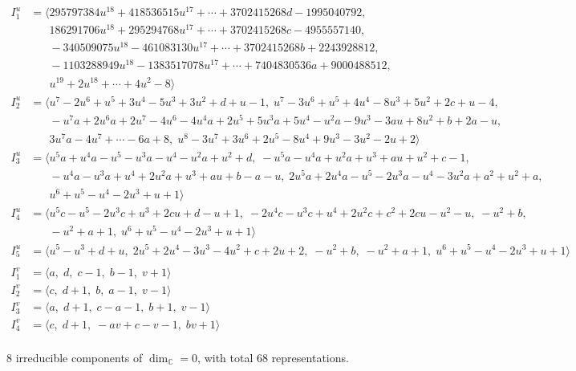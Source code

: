 \documentclass[1p]{elsarticle_modified}
\theoremstyle{definition}
\begin{document}
\begin{align*}
I^u_{1}&=\langle 
295797384 u^{18}+418536515 u^{17}+\cdots+3702415268 d-1995040792,\\
\phantom{I^u_{1}}&\phantom{= \langle  }186291706 u^{18}+295294768 u^{17}+\cdots+3702415268 c-4955557140,\\
\phantom{I^u_{1}}&\phantom{= \langle  }-340509075 u^{18}-461083130 u^{17}+\cdots+3702415268 b+2243928812,\\
\phantom{I^u_{1}}&\phantom{= \langle  }-1103288949 u^{18}-1383517078 u^{17}+\cdots+7404830536 a+9000488512,\\
\phantom{I^u_{1}}&\phantom{= \langle  }u^{19}+2 u^{18}+\cdots+4 u^2-8\rangle \\
I^u_{2}&=\langle 
u^7-2 u^6+u^5+3 u^4-5 u^3+3 u^2+d+u-1,\;u^7-3 u^6+u^5+4 u^4-8 u^3+5 u^2+2 c+u-4,\\
\phantom{I^u_{2}}&\phantom{= \langle  }- u^7 a+2 u^6 a+2 u^7-4 u^6-4 u^4 a+2 u^5+5 u^3 a+5 u^4- u^2 a-9 u^3-3 a u+8 u^2+b+2 a- u,\\
\phantom{I^u_{2}}&\phantom{= \langle  }3 u^7 a-4 u^7+\cdots-6 a+8,\;u^8-3 u^7+3 u^6+2 u^5-8 u^4+9 u^3-3 u^2-2 u+2\rangle \\
I^u_{3}&=\langle 
u^5 a+u^4 a- u^5- u^3 a- u^4- u^2 a+u^2+d,\;- u^5 a- u^4 a+u^2 a+u^3+a u+u^2+c-1,\\
\phantom{I^u_{3}}&\phantom{= \langle  }- u^4 a- u^3 a+u^4+2 u^2 a+u^3+a u+b- a- u,\;2 u^5 a+2 u^4 a- u^5-2 u^3 a- u^4-3 u^2 a+a^2+u^2+a,\\
\phantom{I^u_{3}}&\phantom{= \langle  }u^6+u^5- u^4-2 u^3+u+1\rangle \\
I^u_{4}&=\langle 
u^5 c- u^5-2 u^3 c+u^3+2 c u+d- u+1,\;-2 u^4 c- u^3 c+u^4+2 u^2 c+c^2+2 c u- u^2- u,\;- u^2+b,\\
\phantom{I^u_{4}}&\phantom{= \langle  }- u^2+a+1,\;u^6+u^5- u^4-2 u^3+u+1\rangle \\
I^u_{5}&=\langle 
u^5- u^3+d+u,\;2 u^5+2 u^4-3 u^3-4 u^2+c+2 u+2,\;- u^2+b,\;- u^2+a+1,\;u^6+u^5- u^4-2 u^3+u+1\rangle \\
\\
I^v_{1}&=\langle 
a,\;d,\;c-1,\;b-1,\;v+1\rangle \\
I^v_{2}&=\langle 
c,\;d+1,\;b,\;a-1,\;v-1\rangle \\
I^v_{3}&=\langle 
a,\;d+1,\;c- a-1,\;b+1,\;v-1\rangle \\
I^v_{4}&=\langle 
c,\;d+1,\;- a v+c- v-1,\;b v+1\rangle \\
\end{align*}
\raggedright * 8 irreducible components of $\dim_{\mathbb{C}}=0$, with total 68 representations.\\
\end{document}

